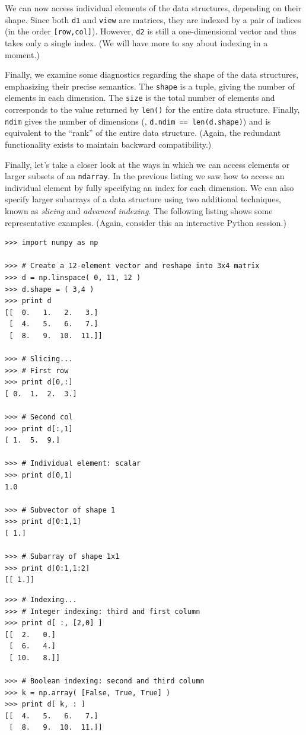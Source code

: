 We can now access individual elements of the data structures,
depending on their shape. Since both \texttt{d1} and \texttt{view} are
matrices, they are indexed by a pair of indices (in the order
\texttt{[row,col]}). However, \texttt{d2} is still a one-dimensional
vector and thus takes only a single index. (We will have more to say
about indexing in a moment.)

Finally, we examine some diagnostics regarding the shape of the data
structures, emphasizing their precise semantics.  The \texttt{shape}
is a tuple, giving the number of elements in each dimension. The
\texttt{size} is the total number of elements and corresponds to the
value returned by \texttt{len()} for the entire data structure.
Finally, \texttt{ndim} gives the number of dimensions (\ie,
\texttt{d.ndim == len(d.shape)}) and is equivalent to the ``rank'' of
the entire data structure. (Again, the redundant functionality exists
to maintain backward compatibility.)

Finally, let's take a closer look at the ways in which we can access
elements or larger subsets of an \texttt{ndarray}. In the previous
listing we saw how to access an individual element by fully specifying
an index for each dimension.  We can also specify larger subarrays of
a data structure using two additional techniques, known as
\emph{slicing}  and \emph{advanced indexing}.  The following listing
shows some representative examples. (Again, consider this an
interactive Python session.)

\begin{verbatim}
>>> import numpy as np

>>> # Create a 12-element vector and reshape into 3x4 matrix
>>> d = np.linspace( 0, 11, 12 )
>>> d.shape = ( 3,4 )
>>> print d
[[  0.   1.   2.   3.]
 [  4.   5.   6.   7.]
 [  8.   9.  10.  11.]]

>>> # Slicing...
>>> # First row
>>> print d[0,:]
[ 0.  1.  2.  3.]

>>> # Second col
>>> print d[:,1]
[ 1.  5.  9.]

>>> # Individual element: scalar
>>> print d[0,1]
1.0

>>> # Subvector of shape 1
>>> print d[0:1,1]
[ 1.]

>>> # Subarray of shape 1x1
>>> print d[0:1,1:2]
[[ 1.]]
\end{verbatim}

\begin{verbatim}
>>> # Indexing...
>>> # Integer indexing: third and first column
>>> print d[ :, [2,0] ]
[[  2.   0.]
 [  6.   4.]
 [ 10.   8.]]

>>> # Boolean indexing: second and third column
>>> k = np.array( [False, True, True] )
>>> print d[ k, : ]
[[  4.   5.   6.   7.]
 [  8.   9.  10.  11.]]
\end{verbatim}\vspace*{-3pt}

